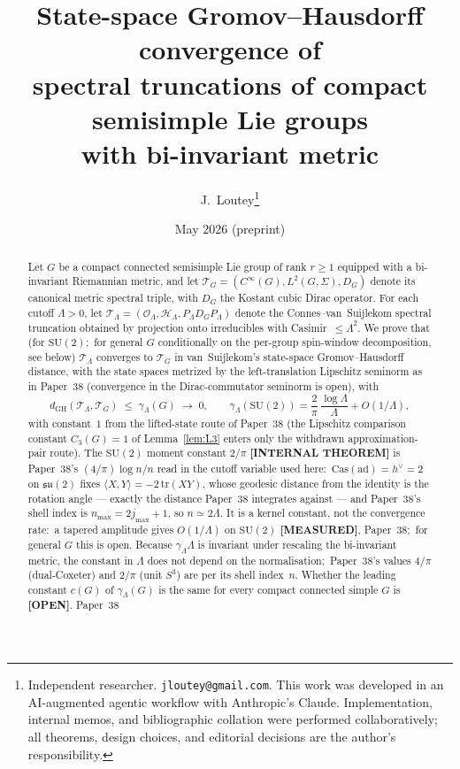\documentclass[11pt,a4paper]{article}
\title{State-space Gromov--Hausdorff convergence of \\
spectral truncations of compact semisimple Lie groups \\
with bi-invariant metric}
\author{J.~Loutey\thanks{Independent researcher. \texttt{jloutey@gmail.com}.
This work was developed in an AI-augmented agentic workflow with
Anthropic's Claude. Implementation, internal memos, and bibliographic
collation were performed collaboratively; all theorems, design choices,
and editorial decisions are the author's responsibility.}}
\date{May 2026 (preprint)}
\theoremstyle{plain}
\theoremstyle{definition}
\newcommand{\Lammax}{\Lambda}
\newcommand{\Hilb}{\mathcal{H}}
\newcommand{\Op}{\mathcal{O}}
\newcommand{\Tcal}{\mathcal{T}}
\newcommand{\SU}{\mathrm{SU}}
\newcommand{\Dop}{D}
\begin{document}
\maketitle

\begin{abstract}
Let $G$ be a compact connected semisimple Lie group of rank $r \ge 1$
equipped with a bi-invariant Riemannian metric, and let
$\Tcal_G = (C^\infty(G), L^2(G, \Sigma), \Dop_G)$ denote its canonical
metric spectral triple, with $\Dop_G$ the Kostant cubic Dirac operator.
For each cutoff $\Lammax > 0$, let
$\Tcal_\Lammax = (\Op_\Lammax, \Hilb_\Lammax, P_\Lammax \Dop_G P_\Lammax)$
denote the Connes--van~Suijlekom spectral truncation obtained by
projection onto irreducibles with Casimir~$\le \Lammax^2$. We prove that
(for $\SU(2)$;\ for general $G$ conditionally on the per-group
spin-window decomposition, see below)
$\Tcal_\Lammax$ converges to $\Tcal_G$ in van~Suijlekom's state-space
Gromov--Hausdorff distance, with the state spaces metrized by the
left-translation Lipschitz seminorm as in Paper~38 (convergence in the
Dirac-commutator seminorm is open), with
\begin{equation*}
   d_{\mathrm{GH}}(\Tcal_\Lammax, \Tcal_G)
   \;\le\; \gamma_\Lammax(G) \;\to\; 0,
   \qquad
   \gamma_\Lammax(\SU(2)) = \frac{2}{\pi}\,\frac{\log \Lammax}{\Lammax} + O(1/\Lammax),
\end{equation*}
with constant~$1$ from the lifted-state route of Paper~38 (the
Lipschitz comparison constant $C_3(G) = 1$ of Lemma~\ref{lem:L3} enters
only the withdrawn approximation-pair route). The $\SU(2)$ moment constant
$2/\pi$ \textbf{[INTERNAL THEOREM]} is Paper~38's $(4/\pi)\log n/n$ read in
the cutoff variable used here:\ $\mathrm{Cas}(\mathrm{ad}) = h^\vee = 2$ on
$\mathfrak{su}(2)$ fixes $\langle X, Y\rangle = -2\,\mathrm{tr}(XY)$, whose
geodesic distance from the identity is the rotation angle --- exactly the
distance Paper~38 integrates against --- and Paper~38's shell index is
$n_{\max} = 2j_{\max} + 1$, so $n \simeq 2\Lammax$. It is a kernel
constant, not the convergence rate:\ a tapered amplitude gives
$O(1/\Lammax)$ on $\SU(2)$ \textbf{[MEASURED]}, Paper~38;\ for general $G$
this is open. Because $\gamma_\Lammax \Lammax$ is invariant under
rescaling the bi-invariant metric, the constant in $\Lammax$ does not
depend on the normalisation;\ Paper~38's values $4/\pi$ (dual-Coxeter)
and $2/\pi$ (unit $S^3$) are per its shell index~$n$. Whether the leading
constant $c(G)$ of $\gamma_\Lammax(G)$ is the same for every compact
connected simple $G$ is \textbf{[OPEN]}. Paper~38

\end{abstract}
\end{document}
